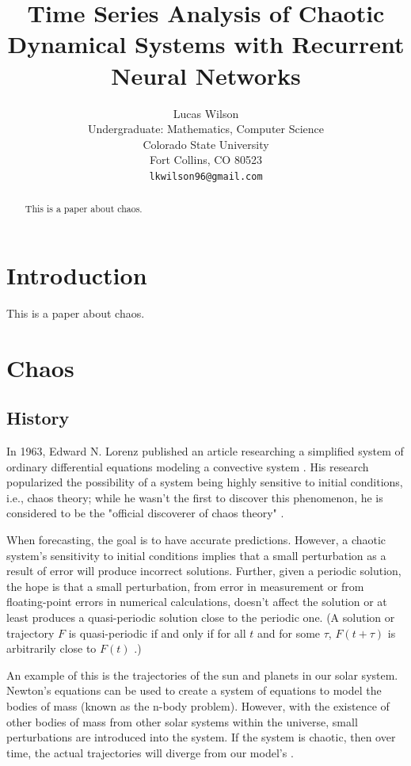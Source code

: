 \documentclass{article}
\title{Time Series Analysis of Chaotic Dynamical Systems with Recurrent Neural Networks}
\author{
  Lucas Wilson \\
  Undergraduate: Mathematics, Computer Science \\
  Colorado State University\\
  Fort Collins, CO 80523 \\
  \texttt{lkwilson96@gmail.com} \\
}
\begin{document}
\maketitle

\begin{abstract}
This is a paper about chaos.
\end{abstract}

\section{Introduction}

This is a paper about chaos.

\section{Chaos}

\subsection{History}

In 1963, Edward N. Lorenz published an article researching a simplified system of 
ordinary differential equations modeling a convective system \cite{lorenz1963deterministic}. His 
research popularized the possibility of a system being highly sensitive to 
initial conditions, i.e., chaos theory; while he wasn't the first to discover 
this phenomenon, he is considered to be the "official discoverer of chaos 
theory" \cite{oestreicher2007history}.

When forecasting, the goal is to have accurate predictions. However, 
a chaotic system's sensitivity to initial conditions implies that a small 
perturbation as a result of error will produce incorrect solutions.
Further, given a periodic
solution, the hope is that a small perturbation, from error in measurement or from 
floating-point errors in numerical calculations, doesn't affect the solution or 
at least produces a quasi-periodic solution close to the periodic one. 
(A solution or trajectory $F$ 
is quasi-periodic if and only if for all $t$ and for some $\tau$, $F(t+\tau)$ 
is arbitrarily close to $F(t)$ \cite{lorenz1963deterministic}.)

An example of this is the trajectories of the sun and planets in our solar 
system. Newton's equations can be used to create a system of equations to model 
the bodies of mass (known as the n-body problem). However, with the existence of
other bodies of mass from other solar systems within the universe, 
small perturbations are introduced into the system. If the system is chaotic, then 
over time, the actual trajectories will diverge from our model's 
\cite{oestreicher2007history}. 
\end{document}
